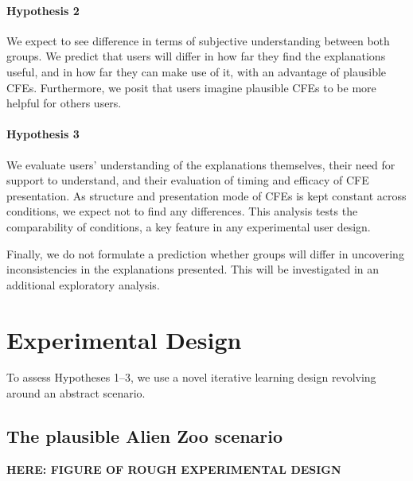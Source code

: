 \paragraph{Hypothesis 2} We expect to see difference in terms of subjective understanding between both groups.
We predict that users will differ in how far they find the explanations useful, and in how far they can make use of it, with an advantage of plausible CFEs. %
Furthermore, we posit that users imagine plausible CFEs to be more helpful for others users. %

\paragraph{Hypothesis 3} We evaluate users' understanding of the explanations themselves, their need for support to understand, and their evaluation of timing and efficacy of \gls{CFE} presentation. As structure and presentation mode of \glspl{CFE} is kept constant across conditions, we expect not to find any differences.
This analysis tests the comparability of conditions, a key feature in any experimental user design.


Finally, we do not formulate a prediction whether groups will differ in uncovering inconsistencies in the explanations presented. This will be investigated in an additional exploratory analysis.%

\section{Experimental Design}\label{sec:experimental-design}

To assess Hypotheses 1--3, we use a novel iterative learning design revolving around an abstract scenario.

\subsection{The plausible Alien Zoo scenario}

\textbf{HERE: FIGURE OF ROUGH EXPERIMENTAL DESIGN}

